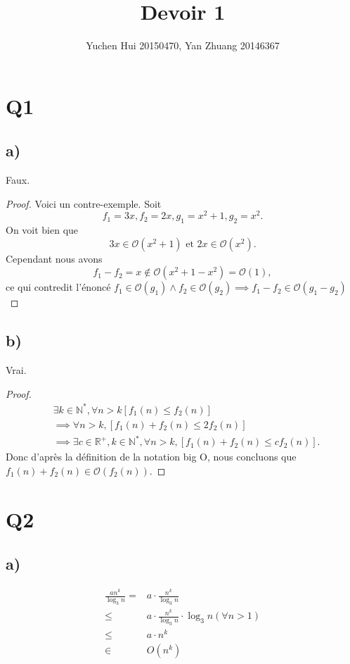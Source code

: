 \documentclass[10pt,a4paper]{article}
\title{Devoir 1}
\author{Yuchen Hui 20150470, Yan Zhuang 20146367}
\begin{document}
\maketitle
\section{Q1}
\subsection{a)}
Faux.
\begin{proof}
	
 Voici un contre-exemple. Soit
\[
f_1 = 3x, f_2 = 2x, g_1 = x^2+1, g_2 = x^2. 
\] 
On voit bien que
\[
3x \in \mathcal{O} \left ( x^2+1 \right ) \text{ et } 2x \in \mathcal{O} \left ( x^2 \right ) 
.\] 
Cependant nous avons  
$$f_1-f_2 = x \not\in \mathcal{O}\left( x^2+1-x^2 \right) = \mathcal{O}\left( 1 \right), $$
ce qui contredit l'énoncé $f_1\in \mathcal{O}\left( g_1 \right) \land f_2\in \mathcal{O}\left( g_2 \right) \implies f_1-f_2 \in \mathcal{O}\left( g_1-g_2 \right) $

\end{proof}
\subsection{b)}
Vrai.
\begin{proof}
	\begin{align*}
		&\exists k\in \mathbb{N}^{*}, \forall n > k \left[ f_1\left( n \right) \le f_2\left( n \right) \right]  \\
		& \implies\forall n>k, \left[f_1\left( n \right) + f_2\left( n \right) \le 2f_2 \left( n \right) \right]\\
		& \implies\exists c\in \mathbb{R}^{+}, k \in \mathbb{N}^{*},\forall n>k, \left[f_1\left( n \right) + f_2\left( n \right) \le cf_2 \left( n \right) \right]
	.\end{align*}
	Donc d'après la définition de la notation big O, nous concluons que $f_1\left( n \right) +f_2\left( n \right) \in \mathcal{O} \left ( f_2\left( n \right)  \right ). $
\end{proof}




\newpage
\section{Q2}
\subsection{a)}
\begin{align*}
    \frac{an^k}{\log_3 n} =& a \cdot \frac{n^k}{\log_3 n} \\
    \leq& a \cdot \frac{n^k}{\log_3 n} \cdot \log_3n (\forall n > 1) \\
    \leq& a \cdot n^k \\
    \in& O(n^k) 
\end{align*}
\end{document}
